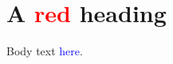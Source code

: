 \documentclass[12pt]{article}
\begin{document}
\section{A \textcolor{red}{red} heading}
Body text \textcolor{blue}{here}.
\end{document}
